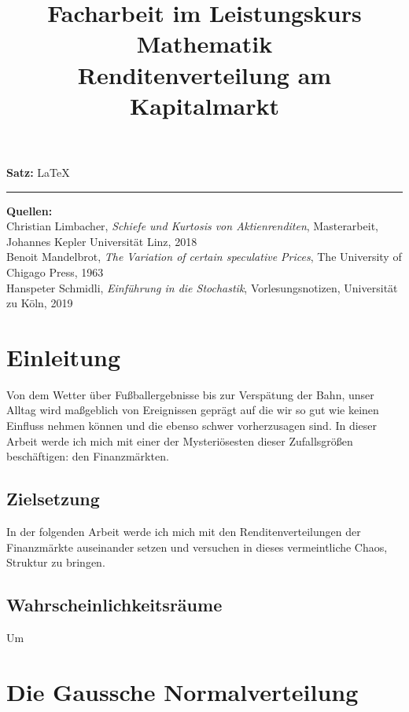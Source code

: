 \documentclass[12pt, a4paper]{report}
\title{\LARGE   Facharbeit im Leistungskurs Mathematik  \vspace*{0.5cm} \\
  \Huge Renditenverteilung am Kapitalmarkt}
\theoremstyle{definition}
\begin{document}
\maketitle
\newpage
\vspace*{\fill}
\begin{normalsize}
\noindent
  \textbf{Satz:}
  \LaTeX
\end{normalsize}
\vspace*{5pt}
\hrule
\vspace{5pt}
\noindent
\textbf{Quellen:}
\\
Christian Limbacher, \textit{Schiefe und Kurtosis von Aktienrenditen}, Masterarbeit, Johannes Kepler Universität Linz, 2018 \\
Benoit Mandelbrot, \textit{The Variation of certain speculative Prices}, The University of Chigago Press, 1963 \\
Hanspeter Schmidli, \textit{Einführung in die Stochastik}, Vorlesungsnotizen, Universität zu Köln, 2019
\tableofcontents
\newpage
\chapter{Einleitung}
Von dem Wetter über Fußballergebnisse bis zur Verspätung der Bahn, unser Alltag wird maßgeblich von Ereignissen geprägt auf die wir so gut wie keinen Einfluss nehmen können und die ebenso schwer vorherzusagen sind. In dieser Arbeit werde ich mich mit einer der Mysteriösesten dieser Zufallsgrößen beschäftigen: den Finanzmärkten.
\section{Zielsetzung}
In der folgenden Arbeit werde ich mich mit den Renditenverteilungen der Finanzmärkte auseinander setzen und versuchen in dieses vermeintliche Chaos, Struktur zu bringen. 


\section{Wahrscheinlichkeitsräume}
Um
\chapter{Die Gaussche Normalverteilung}
\end{document}

